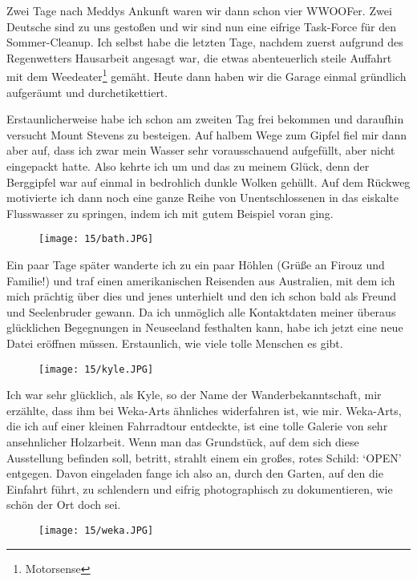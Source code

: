 Zwei Tage nach Meddys Ankunft waren wir dann schon vier WWOOFer. Zwei
Deutsche sind zu uns gestoßen und wir sind nun eine eifrige Task-Force
für den Sommer-Cleanup. Ich selbst habe die letzten Tage, nachdem
zuerst aufgrund des Regenwetters Hausarbeit angesagt war, die etwas
abenteuerlich steile Auffahrt mit dem Weedeater\footnote{Motorsense}
gemäht. Heute dann haben wir die Garage einmal gründlich aufgeräumt
und durchetikettiert.

Erstaunlicherweise habe ich schon am zweiten Tag frei bekommen und
daraufhin versucht Mount Stevens zu besteigen. Auf halbem Wege zum
Gipfel fiel mir dann aber auf, dass ich zwar mein Wasser sehr
vorausschauend aufgefüllt, aber nicht eingepackt hatte. Also kehrte ich
um und das zu meinem Glück, denn der Berggipfel war auf einmal in
bedrohlich dunkle Wolken gehüllt. Auf dem Rückweg motivierte ich dann
noch eine ganze Reihe von Unentschlossenen in das eiskalte Flusswasser
zu springen, indem ich mit gutem Beispiel voran ging.
\begin{figure}[h]
  \centering
  \texttt{[image: 15/bath.JPG]}
\end{figure}

Ein paar Tage später wanderte ich zu ein paar Höhlen (Grüße an Firouz
und Familie!)  und traf einen amerikanischen Reisenden aus Australien,
mit dem ich mich prächtig über dies und jenes unterhielt und den ich
schon bald als Freund und Seelenbruder gewann. Da ich unmöglich alle
Kontaktdaten meiner überaus glücklichen Begegnungen in Neuseeland
festhalten kann, habe ich jetzt eine neue Datei eröffnen
müssen. Erstaunlich, wie viele tolle Menschen es gibt.
\begin{figure}[h]
  \centering
  \texttt{[image: 15/kyle.JPG]}
\end{figure}

Ich war sehr glücklich, als Kyle, so der Name der Wanderbekanntschaft,
mir erzählte, dass ihm bei Weka-Arts ähnliches widerfahren ist, wie
mir. Weka-Arts, die ich auf einer kleinen Fahrradtour entdeckte,
ist eine tolle Galerie von sehr ansehnlicher Holzarbeit. Wenn man das
Grundstück, auf dem sich diese Ausstellung befinden soll, betritt,
strahlt einem ein großes, rotes Schild: `OPEN' entgegen. Davon
eingeladen fange ich also an, durch den Garten, auf den die Einfahrt
führt, zu schlendern und eifrig photographisch zu dokumentieren, wie
schön der Ort doch sei.
\begin{figure}[h]
  \centering
  \texttt{[image: 15/weka.JPG]}
\end{figure}

